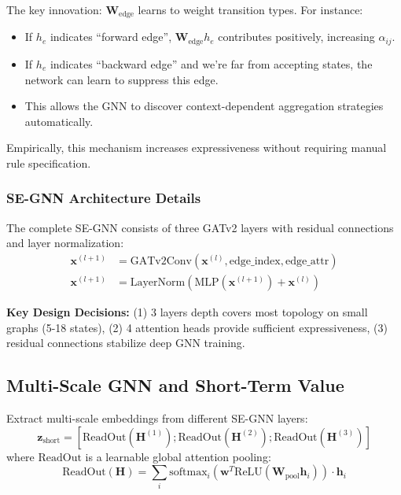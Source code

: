 \documentclass[conference]{IEEEtran}
\begin{document}
The key innovation: $\mathbf{W}_{\text{edge}}$ learns to weight transition types. For instance:
\begin{itemize}
    \item If $h_e$ indicates ``forward edge'', $\mathbf{W}_{\text{edge}} h_e$ contributes positively, increasing $\alpha_{ij}$.
    \item If $h_e$ indicates ``backward edge'' and we're far from accepting states, the network can learn to suppress this edge.
    \item This allows the GNN to discover context-dependent aggregation strategies automatically.
\end{itemize}

Empirically, this mechanism increases expressiveness without requiring manual rule specification.

\subsubsection{SE-GNN Architecture Details}

The complete SE-GNN consists of three GATv2 layers with residual connections and layer normalization:
\begin{align}
\mathbf{x}^{(l+1)} &= \text{GATv2Conv}(\mathbf{x}^{(l)}, \text{edge\_index}, \text{edge\_attr}) \\
\mathbf{x}^{(l+1)} &= \text{LayerNorm}(\text{MLP}(\mathbf{x}^{(l+1)}) + \mathbf{x}^{(l)})
\end{align}

\textbf{Key Design Decisions:} (1) 3 layers depth covers most topology on small graphs (5-18 states), (2) 4 attention heads provide sufficient expressiveness, (3) residual connections stabilize deep GNN training.

\subsection{Multi-Scale GNN and Short-Term Value}

Extract multi-scale embeddings from different SE-GNN layers:
\begin{equation}
\mathbf{z}_{\text{short}} = [\text{ReadOut}(\mathbf{H}^{(1)}); \text{ReadOut}(\mathbf{H}^{(2)}); \text{ReadOut}(\mathbf{H}^{(3)})]
\end{equation}
where $\text{ReadOut}$ is a learnable global attention pooling:
\begin{equation}
\text{ReadOut}(\mathbf{H}) = \sum_{i} \text{softmax}_i(\mathbf{w}^T \text{ReLU}(\mathbf{W}_{\text{pool}} \mathbf{h}_i)) \cdot \mathbf{h}_i
\end{equation}
\end{document}
